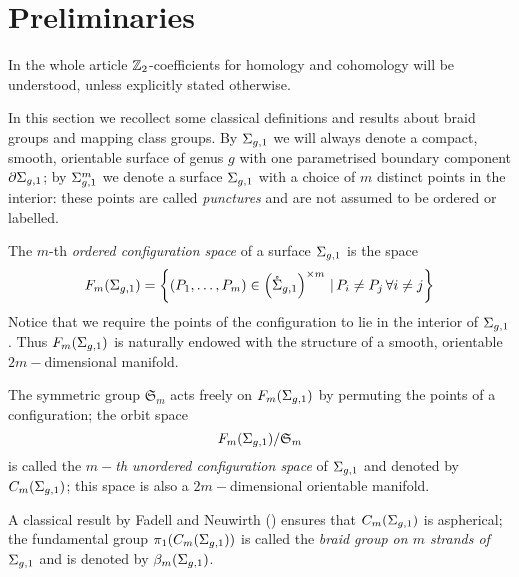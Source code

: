 \section{Preliminaries}
\label{sec:Preliminaries}
In the whole article $\mathbb{Z}_2$-coefficients for homology and cohomology will be understood,
unless explicitly stated otherwise.

In this section we recollect some classical definitions and results about braid groups and mapping class groups.
By $\Sigma_{g,1}$ we will always denote a compact, smooth, orientable surface of genus $g$ with one parametrised
boundary component $\partial \Sigma_{g,1}$; by $\Sigma_{g,1}^m$ we denote a surface $\Sigma_{g,1}$ with a choice of $m$ distinct
points in the interior: these points are called \emph{punctures} and are not assumed to be ordered
or labelled.

\begin{defn}
\label{defn:cms}
 The $m$-th \emph{ordered configuration space} of a surface $\Sigma_{g,1}$ is the space
\[
 F_m(\Sigma_{g,1})=\left\{(P_1,\dots,P_m) \in \left(\mathring{\Sigma}_{g,1}\right)^{\times m}  \,|\,  P_i\neq P_j  \,\forall i\neq j\right\}
\]
 Notice that we require the points of the configuration to lie in the interior of $\Sigma_{g,1}$.
 Thus $F_m(\Sigma_{g,1})$ is naturally endowed with the structure of a smooth, orientable $2m-$dimensional
 manifold.
 
 The symmetric group $\mathfrak{S}_m$ acts freely on $F_m(\Sigma_{g,1})$ by permuting the points of a configuration;
 the orbit space
 \[
 F_m(\Sigma_{g,1})/\mathfrak{S}_m
 \]
 is called the \emph{$m-$th unordered configuration space}
 of $\Sigma_{g,1}$ and denoted by $C_m(\Sigma_{g,1})$; this space is also a $2m-$dimensional orientable manifold.
 
%  
\end{defn}

A classical result by Fadell and Neuwirth (\cite{FadellNeuwirth}) ensures
that $C_m(\Sigma_{g,1})$ is aspherical; the fundamental group $\pi_1(C_m(\Sigma_{g,1}))$ is
called the \emph{braid group on $m$ strands of $\Sigma_{g,1}$} and is denoted by $\beta_{m}(\Sigma_{g,1})$.

